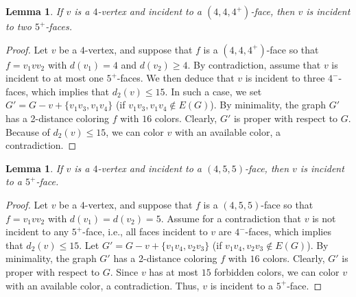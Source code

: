\documentclass[12pt, reqno]{amsart}
\theoremstyle{plain}
\newtheorem{lemma}[equation]{Lemma}
\theoremstyle{definition}
\numberwithin{equation}{section}
\begin{document}
\begin{lemma}\label{lem:4-vertex-bad-3}
If $v$ is a $4$-vertex and incident to a $(4,4,4^+)$-face, then $v$ is incident to two $5^+$-faces.
\end{lemma}
\begin{proof}
Let $v$ be a $4$-vertex, and %
suppose that $f$ is a $(4,4,4^+)$-face so that $f=v_1vv_2$ with $d(v_1)=4$ and $d(v_2)\geq 4$. By contradiction, assume that $v$ is incident to at most one $5^+$-faces. We then deduce that $v$ is incident to three $4^-$-faces, which implies that $d_2(v)\leq 15$.  In such a case, we set $G'=G-v+\{v_1v_3,v_1v_4\}$ (if $v_1v_3,v_1v_4\notin E(G)$).  By minimality, the graph $G'$ has a 2-distance coloring $f$ with $16$ colors. Clearly, $G'$ is proper with respect to $G$. Because of $d_2(v)\leq 15$, we can color $v$ with an available color, a contradiction. 
\end{proof}





\begin{lemma}\label{lem:4-vertex-semi-bad-3}
If $v$ is a $4$-vertex and incident to a $(4,5,5)$-face, then  $v$ is incident to  a $5^+$-face. 
\end{lemma}
\begin{proof}
Let $v$ be a $4$-vertex, and %
suppose that $f$ is a $(4,5,5)$-face so that $f=v_1vv_2$ with $d(v_1)=d(v_2)=5$. Assume for a contradiction that $v$ is not incident to any $5^+$-face, i.e., all faces incident to $v$ are  $4^-$-faces,  which implies that $d_2(v)\leq 15$.    Let $G'=G-v+\{v_1v_4,v_2v_3\}$ (if $v_1v_4,v_2v_3\notin E(G)$).  By minimality, the graph $G'$ has a 2-distance coloring $f$ with $16$ colors. Clearly, $G'$ is proper with respect to $G$. Since $v$ has at most $15$ forbidden colors, we can color $v$ with an available color, a contradiction. Thus, $v$ is incident to  a $5^+$-face. 
\end{proof}
\end{document}
